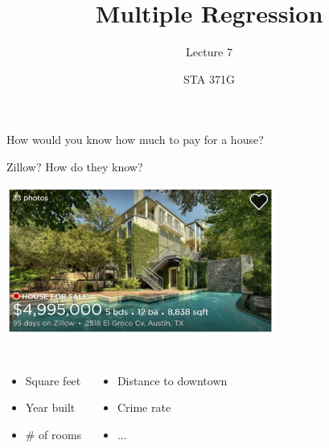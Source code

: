\documentclass{beamer}\usepackage[]{graphicx}\usepackage[]{color}
\title{Multiple Regression}
\subtitle{Lecture 7}
\author{STA 371G}
\begin{document}
  
  
  

  \frame{\maketitle}



  \begin{darkframes}
  
  
    \begin{frame}
      How would you know how much to pay for a house? \pause
      
      Zillow? How do they know? 
      
      \begin{center}
        \includegraphics[width=3.5in]{zillow} \\
      \end{center} \pause
      
      \begin{columns}[onlytextwidth]
          \begin{itemize}
            \item Square feet
            \item Year built
            \item \# of rooms
          \end{itemize}
          \begin{itemize}
            \item Distance to downtown
            \item Crime rate
            \item ...
          \end{itemize}
      \end{columns}
      

\end{frame}
\end{darkframes}
\end{document}
